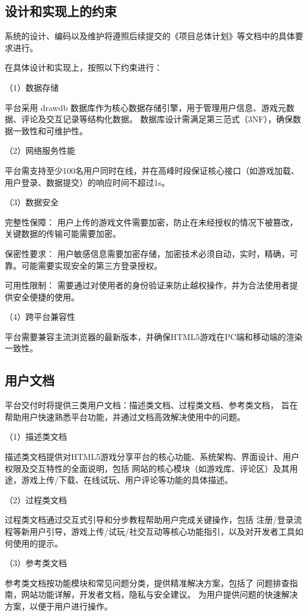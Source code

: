 \documentclass[12pt]{ctexart} %
\begin{document}
\subsection{设计和实现上的约束}
系统的设计、编码以及维护将遵照后续提交的《项目总体计划》等文档中的具体要求进行。

在具体设计和实现上，按照以下约束进行：

（1）数据存储

平台采用 drawdb 数据库作为核心数据存储引擎，用于管理用户信息、游戏元数据、评论及交互记录等结构化数据。
数据库设计需满足第三范式（3NF），确保数据一致性和可维护性。

（2）网络服务性能

平台需支持至少100名用户同时在线，并在高峰时段保证核心接口（如游戏加载、用户登录、数据提交）的响应时间不超过1s。

（3）数据安全

完整性保障：
用户上传的游戏文件需要加密，防止在未经授权的情况下被篡改，关键数据的传输可能需要加密。

保密性要求：
用户敏感信息需要加密存储，加密技术必须自动，实时，精确，可靠。可能需要实现安全的第三方登录授权。

可用性限制：
需要通过对使用者的身份验证来防止越权操作，并为合法使用者提供安全便捷的使用。

（4）跨平台兼容性

平台需要兼容主流浏览器的最新版本，并确保HTML5游戏在PC端和移动端的渲染一致性。



\subsection{用户文档}
平台交付时将提供三类用户文档：描述类文档、过程类文档、参考类文档，
旨在帮助用户快速熟悉平台功能，并通过文档高效解决使用中的问题。

（1）描述类文档

描述类文档提供对HTML5游戏分享平台的核心功能、系统架构、界面设计、用户权限及交互特性的全面说明，包括
网站的核心模块（如游戏库、评论区）及其用途，游戏上传/下载、在线试玩、用户评论等功能的具体描述。

（2）过程类文档

过程类文档通过交互式引导和分步教程帮助用户完成关键操作，包括
注册/登录流程等新用户引导，游戏上传/试玩/社交互动等核心功能指引，以及对开发者工具如何使用的提示。

（3）参考类文档

参考类文档按功能模块和常见问题分类，提供精准解决方案，包括了
问题排查指南，网站功能详解，开发者文档，隐私与安全建议。
为用户提供问题的快速解决方案，以便于用户进行操作。
\end{document}
